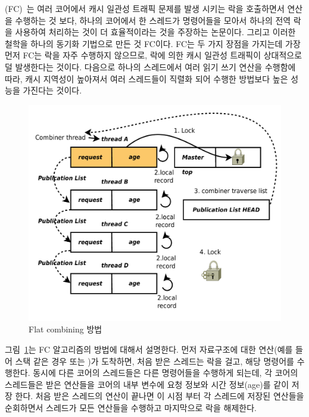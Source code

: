 (FC)~\cite{Hendler2010FC}는 여러 코어에서 캐시 일관성 트래픽 문제를 발생 시키는 
락을 호출하면서 연산을 수행하는 것 보다, 하나의 코어에서 한 스레드가 명령어들을 
모아서 하나의 전역 락을 사용하여 처리하는 것이 더 효율적이라는 것을 주장하는 논문이다.
그리고 이러한 철학을 하나의 동기화 기법으로 만든 것 FC이다.
FC는 두 가지 장점을 가지는데 가장 먼저 FC는 락을 자주 수행하지 않으므로, 락에 의한 
캐시 일관성 트래픽이 상대적으로 덜 발생한다는 것이다.
다음으로 하나의 스레드에서 여러 읽기 쓰기 연산을 수행함에 따라, 캐시 지역성이 높아져서 
여러 스레드들이 직렬화 되어 수행한 방법보다 높은 성능을 가진다는 것이다. 

\begin{figure}[h!]
    \centering
    \includegraphics[width=1\textwidth]{fig/FC/FC}
    \caption{Flat combining 방법}
  \label{fig:FC}
\end{figure}

그림~\ref{fig:FC}는 FC 알고리즘의 방법에 대해서 설명한다. 
먼저 자료구조에 대한 연산(예를 들어 스택 같은 경우  또는 )가 도착하면, 
처음 받은 스레드는 락을 걸고, 해당 명령어를 수행한다. 
동시에 다른 코어의 스레드들은 다른 명령어들을 수행하게 되는데, 각 코어의 스레드들은 
받은 연산들을 코어의 내부 변수에 요청 정보와 시간 정보(age)를 같이 저장 한다.
처음 받은 스레드의 연산이 끝나면 이 시점 부터 각 스레드에 저장된 연산들을 순회하면서  스레드가 
모든 연산들을 수행하고 마지막으로 락을 해제한다.

